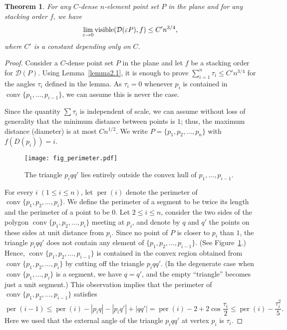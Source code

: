 \documentclass[11pt]{article}
\newtheorem{thm}{Theorem}             \newtheorem{lem}[thm]{Lemma}
\DeclareMathOperator{\vis}{\mathrm{visible}}
\DeclareMathOperator{\conv}{\mathrm{conv}}
\DeclareMathOperator{\per}{\mathrm{per}}
\newcommand{\eps}{\varepsilon}
\begin{document}
{
\renewcommand{\thethm}{2}
\begin{thm}For any $C$-dense $n$-element point set $P$ in the plane and for any stacking order $f$, we have
$$\lim_{\eps\rightarrow 0}\vis({\cal D}(\eps P),f)\le C'n^{3/4},$$
where $C'$ is a constant depending only on $C$.
\end{thm}
\addtocounter{thm}{-1}
}

\begin{proof}
Consider a $C$-dense point set $P$ in the
plane and let $f$ be a stacking order for $\mathcal D(P)$. Using Lemma~\ref{lemma2.1}, it
is enough to prove $\sum_{i=1}^n\tau_i\le C'n^{3/4}$ for the angles $\tau_i$ defined
in the lemma. As $\tau_i=0$ whenever $p_i$ is contained in
$\conv\{p_1,\ldots,p_{i-1}\}$, we can assume this is never the case.

Since the quantity $\sum \tau_i$ is independent of scale, we can assume without
loss of generality that the minimum distance between points is
$1$; thus, the maximum distance (diameter) is at most $C n^{1/2}$. We write
$P=\{p_1, p_2,\ldots, p_n\}$ with $f(D(p_i))=i$.

\begin{figure}
\centerline{\texttt{[image: fig\_perimeter.pdf]}}
\caption{\label{fig_perimeter}The triangle $p_iqq'$ lies entirely outside the convex hull of $p_1, \ldots, p_{i-1}$.}
\end{figure}

For every $i\; (1\le i\le n)$, let $\per(i)$ denote the perimeter of
$\conv\{p_1, p_2,\ldots, p_i\}$. We define the perimeter of a segment to be
twice its length and the perimeter of a point to be $0$. Let
$2\le i\le n$, consider the two sides of the polygon $\conv\{p_1,
p_2,\ldots, p_i\}$ meeting at $p_i$, and denote by $q$ and $q'$ the points on these sides
at unit distance from $p_i$. Since no point of $P$ is closer to $p_i$ than
$1$, the triangle $p_iqq'$ does not contain any element of $\{p_1, p_2,\ldots,
p_{i-1}\}$. (See Figure~\ref{fig_perimeter}.) Hence, $\conv\{p_1, p_2,\ldots, p_{i-1}\}$ is contained in the
convex region obtained from $\conv\{p_1,\allowbreak p_2,\allowbreak \ldots,\allowbreak p_i\}$ by cutting off the
triangle $p_iqq'$. (In the degenerate case when $\conv\{p_1,\allowbreak \ldots,\allowbreak p_i\}$ is a
segment, we have $q=q'$,
and the empty ``triangle'' becomes just a unit segment.) This observation implies that the perimeter of $\conv\{p_1, p_2,\ldots, p_{i-1}\}$ satisfies
$$\per(i-1)\le \per(i)-|p_iq|-|p_iq'|+|qq'|= \per(i)-2+2\cos\frac{\tau_i}{2}\le \per(i)-\frac{\tau_i^2}{5}.$$
Here we used that the external angle of the triangle $p_iqq'$ at vertex $p_i$ is $\tau_i$.


\end{proof}
\end{document}
